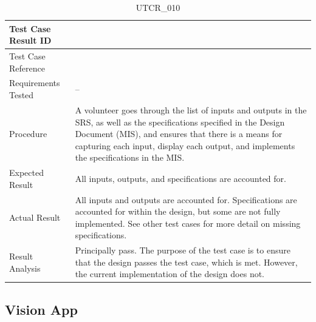 \documentclass[12pt, titlepage]{article}
\begin{document}
\begin{table}[!h]
\begin{center}
\caption {UTCR\_010}
\label{tab:UTCR_010}
\begin{tabular}{ | m{3.2cm} | m{12.2cm} | } 
\hline
Test Case Result ID & \nameref{tab:UTCR_010} \\ 
\hline
Test Case Reference & \nameref{tab:UTC_010}  \\ 
\hline
Requirements Tested & -- \\ 
\hline
Procedure & A volunteer goes through the list of inputs and outputs in the SRS, as well as the specifications specified in the Design Document (MIS), and ensures that there is a means for capturing each input, display each output, and implements the specifications in the MIS. \\ 
\hline
Expected Result & All inputs, outputs, and specifications are accounted for.  \\ 
\hline
Actual Result & All inputs and outputs are accounted for. Specifications are accounted for within the design, but some are not fully implemented. See other test cases for more detail on missing specifications. \\ 
\hline
Result Analysis & Principally pass. The purpose of the test case is to ensure that the design passes the test case, which is met. However, the current implementation of the design does not. \\ 
\hline
\end{tabular}
\end{center}
\end{table}

\clearpage

\subsection{Vision App}
\label{subsec:visionApp}
\end{document}
